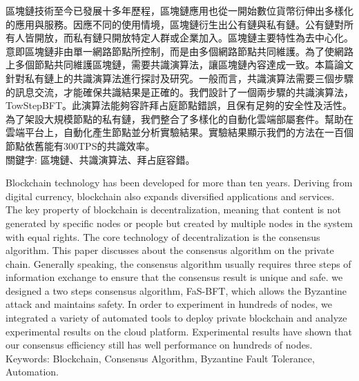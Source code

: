 \begin{abstractzh}
區塊鏈技術至今已發展十多年歷程，區塊鏈應用也從一開始數位貨幣衍伸出多樣化的應用與服務。因應不同的使用情境，區塊鏈衍生出公有鏈與私有鏈。公有鏈對所有人皆開放，而私有鏈只開放特定人群或企業加入。區塊鏈主要特性為去中心化。意即區塊鏈非由單一網路節點所控制，而是由多個網路節點共同維護。為了使網路上多個節點共同維護區塊鏈，需要共識演算法，讓區塊鏈內容達成一致。本篇論文針對私有鏈上的共識演算法進行探討及研究。一般而言，共識演算法需要三個步驟的訊息交流，才能確保共識結果是正確的。我們設計了一個兩步驟的共識演算法，TowStep­BFT。此演算法能夠容許拜占庭節點錯誤，且保有足夠的安全性及活性。為了架設大規模節點的私有鏈，我們整合了多樣化的自動化雲端部屬套件。幫助在雲端平台上，自動化產生節點並分析實驗結果。實驗結果顯示我們的方法在一百個節點依舊能有300TPS的共識效率。\\

\noindent
關鍵字: 區塊鏈、共識演算法、拜占庭容錯。 
\end{abstractzh}

\begin{abstracten}
Blockchain technology has been developed for more than ten years. Deriving from digital currency, blockchain also expands diversified applications and services. The key property of blockchain is decentralization, meaning that content is not generated by specific nodes or people but created by multiple nodes in the system with equal rights. The core technology of decentralization is the consensus algorithm. This paper discusses about the consensus algorithm on the private chain. Generally speaking, the consensus algorithm usually requires three steps of information exchange to ensure that the consensus result is unique and safe. we designed a two steps consensus algorithm, FaS-BFT, which allows the Byzantine attack and maintains safety. In order to experiment in hundreds of nodes, we integrated a variety of automated tools to deploy private blockchain and analyze experimental results on the cloud platform. Experimental results have shown that our consensus efficiency still has well performance on hundreds of nodes. \\
	
\noindent
Keywords: Blockchain, Consensus Algorithm, Byzantine Fault Tolerance, Automation. 
\end{abstracten}
